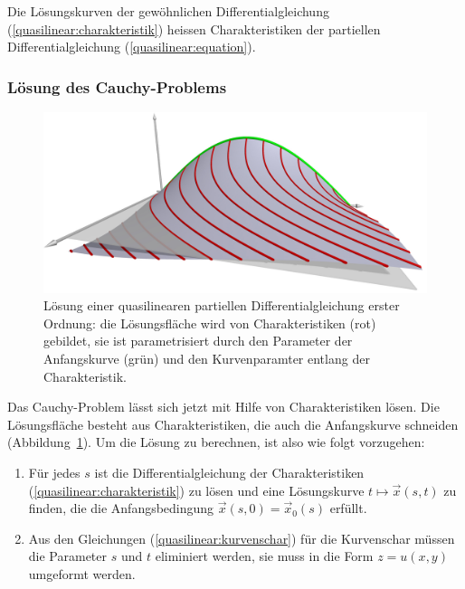 \begin{definition}
\label{def:quasiliniear:charakteristik}
Die Lösungskurven der gewöhnlichen Differentialgleichung
(\ref{quasilinear:charakteristik}) heissen Charakteristiken
der partiellen Differentialgleichung (\ref{quasilinear:equation}).
\end{definition}

\subsubsection{Lösung des Cauchy-Problems}
\begin{figure}
\begin{center}
\includegraphics[width=\hsize]{3d/sol.jpg}
\end{center}
\caption{Lösung einer quasilinearen partiellen Differentialgleichung
erster Ordnung: die Lösungsfläche wird von Charakteristiken (rot) gebildet,
sie ist parametrisiert durch den Parameter der Anfangskurve (grün) und den
Kurvenparamter entlang der Charakteristik.
\label{geometrie:loesung-mit-charakteristiken}}
\end{figure}
Das Cauchy-Problem lässt sich jetzt mit Hilfe von Charakteristiken
lösen. Die Lösungsfläche besteht aus Charakteristiken, die auch
die Anfangskurve schneiden
(Abbildung~\ref{geometrie:loesung-mit-charakteristiken}).
Um die Lösung zu berechnen, ist also wie folgt vorzugehen:
\begin{enumerate}
\item
Für jedes $s$ ist die Differentialgleichung der Charakteristiken
(\ref{quasilinear:charakteristik}) zu lösen und eine 
Lösungskurve $t\mapsto \vec x(s,t)$ zu finden, die
die Anfangsbedingung $\vec x(s,0)=\vec x_0(s)$ erfüllt.
\item 
Aus den Gleichungen (\ref{quasilinear:kurvenschar}) für die
Kurvenschar müssen die Parameter $s$ und $t$ eliminiert werden,
sie muss in die Form $z=u(x,y)$ umgeformt werden.
\end{enumerate}

